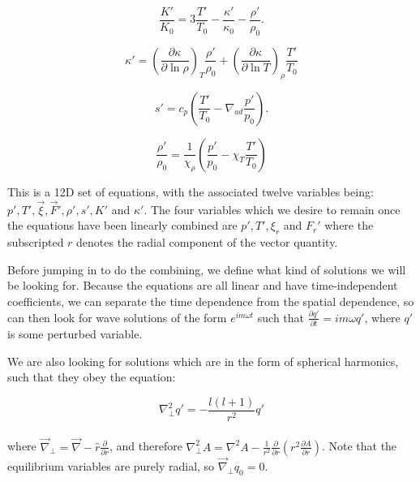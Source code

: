 \documentclass[11pt]{amsart}
\begin{document}
\begin{equation} \label{eq:K_lin}
\frac{K'}{K_{0}} = 3 \frac{T'}{T_{0}} - \frac{\kappa'}{\kappa_{0}} - \frac{\rho'}{\rho_{0}}.
\end{equation}



\begin{equation} \label{eq:kap_lin}
\kappa' = \left( \frac{\partial \kappa}{\partial \ln \rho} \right)_{T} \frac{\rho'}{\rho_{0}} + \left( \frac{\partial \kappa}{\partial \ln T} \right)_{\rho} \frac{T'}{T_{0}}
\end{equation}


\begin{equation} \label{eq:ent_lin}
s' = c_{p} \left( \frac{T'}{T_{0}} - \nabla_{ad} \frac{p'}{p_{0}} \right).
\end{equation} 



\begin{equation} \label{eq:rho_lin}
\frac{\rho'}{\rho_{0}}= \frac{1}{\chi_{\rho}} \left( \frac{p'}{p_{0}} - \chi_{T} \frac{T'}{T_{0}} \right)
\end{equation}


This is a 12D set of equations, with the associated twelve variables being: $p', T', \vec{\xi}, \vec{F}',
\rho', s', K'$ and $\kappa'$.  The four variables which we desire to remain once the equations have been
linearly combined are $p', T', \xi_{r}$ and $F_{r}'$ where the subscripted $r$ denotes the radial component
of the vector quantity.

Before jumping in to do the combining, we define what kind of solutions we will be looking for.  Because the
equations are all linear and have time-independent coefficients, we can separate the time dependence from
the spatial dependence, so can then look for wave solutions of the form $e^{i m \omega t}$ such that
$\frac{\partial q'}{\partial t} = i m \omega q'$, where $q'$ is some perturbed variable.

We are also looking for solutions which are in the form of spherical harmonics, such that they obey the
equation:

\begin{equation} \label{eq:perp}
\nabla_{\perp}^{2} q' = - \frac{l ( l + 1) }{r^2} q'
\end{equation}
\\
where $\vec{\nabla}_{\perp} = \vec{\nabla} - \hat{r} \frac{\partial}{\partial r}$, and therefore $\nabla_{\perp}^{2} A = \nabla^{2}A - \frac{1}{r^{2}} \frac{\partial}{\partial r} \left( r^{2} \frac{\partial A}{\partial r} \right)$.
Note that the equilibrium variables are purely radial, so $\vec{\nabla}_{\perp} q_{0} = 0$.
\end{document}

